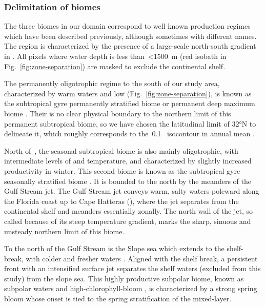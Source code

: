 \subsubsection{Delimitation of biomes}

The three biomes in our domain correspond to well known production regimes which have been described previously, although sometimes with different names.
The region is characterized by the presence of a large-scale north-south gradient in .
All pixels where water depth is less than~\qty{<1500}{\m} (red isobath in Fig.~\ref{fig:zone-separation}) are masked to exclude the continental shelf.

The permanently oligotrophic regime to the south of our study area, characterized by warm waters and low  (Fig.~\ref{fig:zone-separation}), is known as the subtropical gyre permanently stratified biome \parencite{sarmiento_2004} or permanent deep  maximum biome \parencite{bock_2022}.
Their is no clear physical boundary to the northern limit of this permanent subtropical biome, so we have chosen the latitudinal limit of 32°N to delineate it, which roughly corresponds to the~\qty{0.1}{\mgm}~ isocontour in annual mean .

North of~, the seasonal subtropical biome is also mainly oligotrophic, with intermediate levels of  and temperature, and characterized by slightly increased productivity in winter.
This second biome is known as the subtropical gyre seasonally stratified biome \parencite{sarmiento_2004}.
It is bounded to the north by the meanders of the Gulf Stream jet.
The Gulf Stream jet conveys warm, salty waters poleward along the Florida coast up to Cape Hatteras (), where the jet separates from the continental shelf and meanders essentially zonally.
The north wall of the jet, so called because of its steep temperature gradient, marks the sharp, sinuous and unsteady northern limit of this biome.

To the north of the Gulf Stream is the Slope sea which extends to the shelf-break, with colder and fresher waters \parencite{linder_1998}.
Aligned with the shelf break, a persistent front with an intensified surface jet separates the shelf waters (excluded from this study) from the slope sea.
This highly productive subpolar biome, known as subpolar waters \parencite{sarmiento_2004} and high-chlorophyll-bloom \parencite{bock_2022}, is characterized by a strong spring bloom whose onset is tied to the spring stratification of the mixed-layer.


